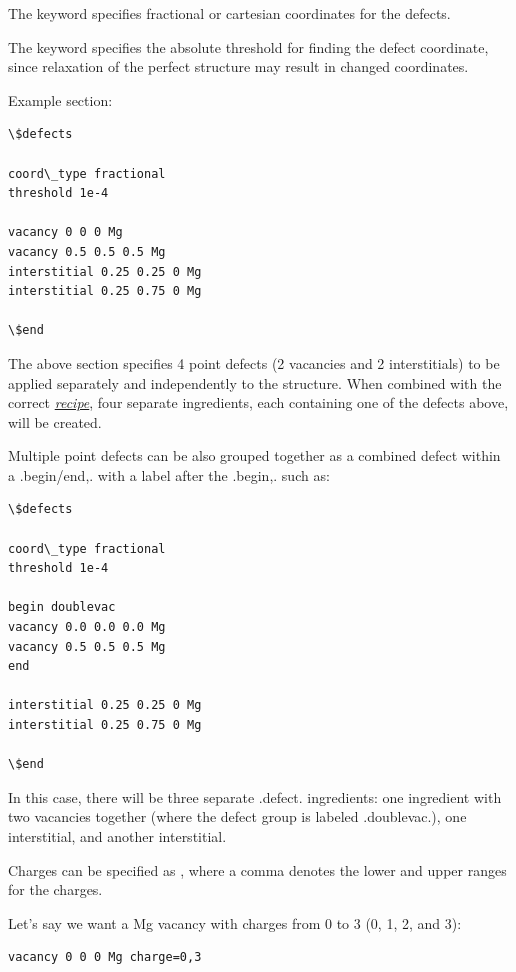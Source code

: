 \documentclass[letterpaper,10pt,english]{sphinxmanual}
\begin{document}
The  keyword specifies fractional or cartesian coordinates for the defects.

The  keyword specifies the absolute threshold for finding the defect coordinate, since relaxation of the perfect structure may result in changed coordinates.

Example  section:

\begin{Verbatim}[commandchars=\\\{\}]
\$defects

coord\_type fractional
threshold 1e-4

vacancy 0 0 0 Mg
vacancy 0.5 0.5 0.5 Mg
interstitial 0.25 0.25 0 Mg
interstitial 0.25 0.75 0 Mg

\$end
\end{Verbatim}

The above section specifies 4 point defects (2 vacancies and 2 interstitials) to be applied separately and independently to the structure. When combined with the correct {\hyperref[4_0_recipe::doc]{\emph{recipe}}}, four separate ingredients, each containing one of the defects above, will be created.

Multiple point defects can be also grouped together as a combined defect within a .begin/end,. with a label after the .begin,. such as:

\begin{Verbatim}[commandchars=\\\{\}]
\$defects

coord\_type fractional
threshold 1e-4

begin doublevac
vacancy 0.0 0.0 0.0 Mg
vacancy 0.5 0.5 0.5 Mg
end

interstitial 0.25 0.25 0 Mg
interstitial 0.25 0.75 0 Mg

\$end
\end{Verbatim}

In this case, there will be three separate .defect. ingredients: one ingredient with two vacancies together (where the defect group is labeled .doublevac.), one interstitial, and another interstitial.

Charges can be specified as , where a comma denotes the lower and upper ranges for the charges.

Let's say we want a Mg vacancy with charges from 0 to 3 (0, 1, 2, and 3):

\begin{Verbatim}[commandchars=\\\{\}]
vacancy 0 0 0 Mg charge=0,3
\end{Verbatim}
\end{document}
